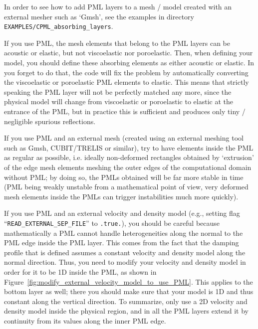 \documentclass[oneside,english,onecolumn,letterpaper]{book}
\begin{document}
In order to see how to add PML layers to a mesh / model created with an external mesher such as `Gmsh', see the examples in directory
\texttt{EXAMPLES/CPML\_absorbing\_layers}.

If you use PML, the mesh elements that belong to the PML layers can be acoustic or elastic, but not viscoelastic nor poroelastic.
Then, when defining your model, you should define these absorbing elements as either acoustic or elastic.
In you forget to do that, the code will fix the problem by automatically converting the viscoelastic or poroelastic PML
elements to elastic. This means that strictly speaking the PML layer will not be perfectly matched any more, since the physical
model will change from viscoelastic or poroelastic to elastic at the entrance of the PML, but in practice this is sufficient and
produces only tiny / negligible spurious reflections.

If you use PML and an external mesh (created using an external meshing tool 
such as Gmsh, CUBIT/TRELIS or similar), try to have elements inside the PML as regular as possible,
i.e. ideally non-deformed rectangles obtained by `extrusion' of the edge mesh elements meshing the
outer edges of the computational domain without PML; by doing so, the PMLs obtained will be far more stable
in time (PML being weakly unstable from a mathematical point of view, very deformed mesh elements
inside the PMLs can trigger instabilities much more quickly).

If you use PML and an external velocity and density model (e.g., setting flag ``\texttt{READ\_EXTERNAL\_SEP\_FILE}'' to \texttt{.true.}),
you should be careful because mathematically a PML cannot handle heterogeneities along the
normal to the PML edge inside the PML layer. This comes from the fact that the damping profile
that is defined assumes a constant velocity and density model along the normal
direction.
Thus, you need to modify your velocity and density model in order for it to be 1D inside
the PML, as shown in Figure~\ref{fig:modify_external_velocity_model_to_use_PML}.
This applies to the bottom layer as well; there you should make sure
that your model is 1D and thus constant along the vertical direction.
To summarize, only use a 2D velocity and density model inside the physical region, and in
all the PML layers extend it by continuity from its values along the
inner PML edge.
\end{document}
